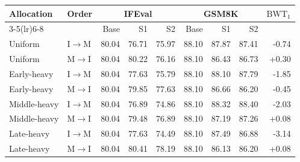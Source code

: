 \begin{tabular}{llrrrrrrr}
\toprule
Allocation & Order & \multicolumn{3}{c}{IFEval} & \multicolumn{3}{c}{GSM8K} & $\mathrm{BWT}_1$ \\
\cmidrule(lr){3-5}\cmidrule(lr){6-8}
 & & Base & S1 & S2 & Base & S1 & S2 &  \\
\midrule
Uniform & I$\rightarrow$M & 80.04 & 76.71 & 75.97 & 88.10 & 87.87 & 87.41 & -0.74 \\
Uniform & M$\rightarrow$I & 80.04 & 80.22 & 76.16 & 88.10 & 86.43 & 86.73 & +0.30 \\
Early-heavy & I$\rightarrow$M & 80.04 & 77.63 & 75.79 & 88.10 & 88.10 & 87.79 & -1.85 \\
Early-heavy & M$\rightarrow$I & 80.04 & 79.85 & 77.63 & 88.10 & 86.66 & 86.20 & -0.45 \\
Middle-heavy & I$\rightarrow$M & 80.04 & 76.89 & 74.86 & 88.10 & 88.32 & 88.40 & -2.03 \\
Middle-heavy & M$\rightarrow$I & 80.04 & 79.48 & 76.89 & 88.10 & 87.19 & 87.26 & +0.08 \\
Late-heavy & I$\rightarrow$M & 80.04 & 77.63 & 74.49 & 88.10 & 87.49 & 86.88 & -3.14 \\
Late-heavy & M$\rightarrow$I & 80.04 & 80.41 & 78.19 & 88.10 & 86.13 & 86.20 & +0.08 \\
\bottomrule
\end{tabular}
